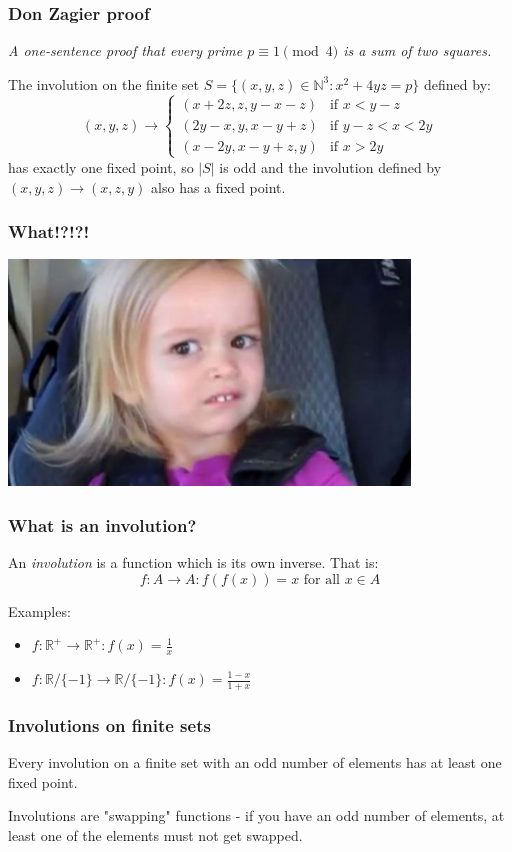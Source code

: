 \documentclass{beamer}
\begin{document}
\begin{frame}
	\frametitle{Don Zagier proof}
	
	{\em A one-sentence proof that every prime $p\equiv 1 \pmod{4}$ is a sum of two squares.}

	The involution on the finite set $S = \{(x,y,z) \in \mathbb{N}^3:x^2+4yz = p \}$
	defined by:
	\begin{equation*}
		(x,y,z) \rightarrow
		\begin{cases}
			(x + 2z, z, y - x - z) & \text{if } x < y-z \\
			(2y - x, y, x - y + z) & \text{if } y - z < x < 2y \\
			(x - 2y, x - y + z, y) & \text{if } x > 2y
		\end{cases}
	\end{equation*}
	has exactly one fixed point, so $|S|$ is odd and the involution defined by 
	$(x,y,z) \rightarrow(x,z,y)$ also has a fixed point.

\end{frame}

\begin{frame}
	\frametitle{What!?!?!}

        \begin{center}
             \includegraphics[width=0.8\textwidth]{side-eye-chloe.jpg}
        \end{center}

\end{frame}

\begin{frame}
	\frametitle{What is an involution?}

	An {\em involution} is a function which is its own inverse. That is:
	\[ f: A \rightarrow A : f(f(x)) = x \text{ for all } x \in A \]

	Examples:
	\begin{itemize}
		\item $ f:\mathbb{R}^+ \rightarrow \mathbb{R}^+: f(x) = \frac{1}{x} $
		\item $ f:\mathbb{R}/\{-1\} \rightarrow \mathbb{R}/\{-1\}: f(x) = \frac{1-x}{1+x} $
	\end{itemize}

\end{frame}
\begin{frame}
	\frametitle{Involutions on finite sets}

	Every involution on a finite set with an odd number of elements has at least one fixed point.

	Involutions are "swapping" functions - if you have an odd number of elements, at least one of
	the elements must not get swapped.
\end{frame}
\end{document}
